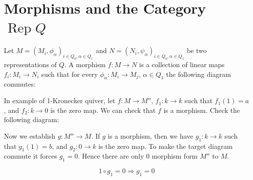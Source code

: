 \documentclass[11pt, a4paper]{report}
\begin{document}
\section{Morphisms and the Category \texorpdfstring{$\operatorname{Rep}Q$}{Rep Q}}

\begin{definition} 
Let $ M=(M_i, \phi_{\alpha})_{i \in Q_0, \alpha \in Q_1} $ and $ N=(N_i, \psi_{\alpha})_{i \in Q_0, \alpha \in Q_1} $ be two representations of $ Q $. A morphism $ f: M \to N $ is a collection of linear maps $ f_i: M_i \to N_i $ such that for every $ \phi_{\alpha}: M_i \to M_j $, $ \alpha \in Q_1 $ the following diagram commutes:
    \begin{center}
    \end{center}
\end{definition}

\begin{example} 
In example of 1-Kronecker quiver, let $ f: M \to M'' $, $ f_1: k \to k $ such that $ f_1(1)=a $, and $ f_2: k \to 0 $ is the zero map. We can check that $ f $ is a morphism. Check the following diagram:
\begin{center}
\end{center}

Now we establish $ g: M'' \to M $. If $ g $ is a morphism, then we have $ g_1: k \to k $ such that $ g_1(1)=b $, and $ g_2: 0 \to k $ is the zero map. To make the target diagram commute it forces $ g_1=0 $. Hence there are only $ 0 $ morphism form $ M'' $ to $ M $.
\begin{center}
\end{center}

\[ 1 \circ g_1 = 0 \Rightarrow g_1=0 \]
\end{example}
\end{document}
